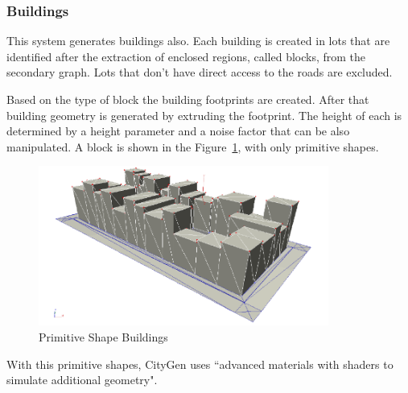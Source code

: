 \subsubsection{Buildings} %
\label{ssub:buildings}

This system generates buildings also. Each building is created in lots that are identified after the extraction of enclosed regions, called blocks, from the secondary graph. Lots that don't have direct access to the roads are excluded.

Based on the type of block the building footprints are created. After that building geometry is generated by extruding the footprint. The height of each is determined by a height parameter and a noise factor that can be also manipulated. A block is shown in the Figure~\ref{fig:primitiveShapes}, with only primitive shapes.

\begin{figure}[htbp]
	\centering
	\includegraphics[width=0.85\textwidth]{img/CityGen/BockPrimitiveShapes.png}
	\caption{Primitive Shape Buildings}
	\label{fig:primitiveShapes}
\end{figure}

With this primitive shapes, CityGen uses ``advanced materials with shaders to simulate additional geometry".


